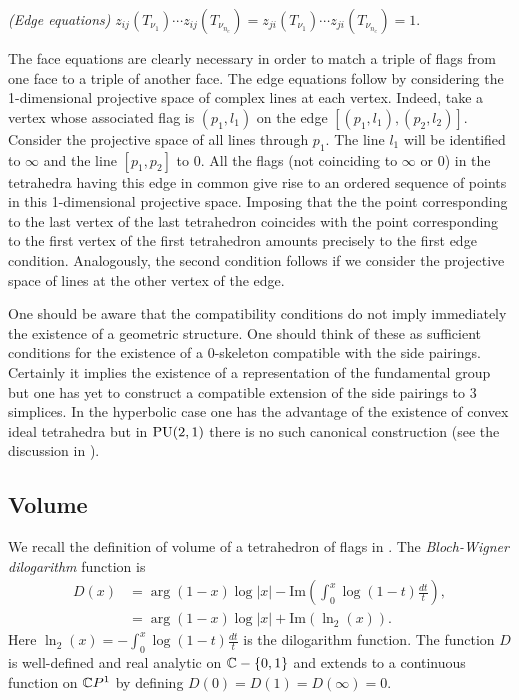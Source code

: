 \medskip

\emph{(Edge equations)} $z_{ij}(T_{\nu_1}) \cdots z_{ij}(T_{\nu_{n_e}})=z_{ji}(T_{\nu_1}) \cdots z_{ji}(T_{\nu_{n_e}})=1$.

\medskip

The face equations are clearly necessary in order to match a triple of flags from one face to a triple of another face.  The edge equations follow by considering the 1-dimensional projective space of complex lines at each vertex.  Indeed, take a vertex whose associated flag is $(p_1,l_1)$ on the edge $[(p_1,l_1),(p_2,l_2)]$.  Consider the projective space of all lines through $p_1$.  The line $l_1$ will be identified to $\infty$ and the line $[p_1,p_2]$ to 0.  All the flags (not coinciding to $\infty$ or 0) in the tetrahedra
having this edge in common give rise to an ordered sequence of points in this 1-dimensional projective space.   Imposing that the the point corresponding to the last vertex of the last tetrahedron coincides with the point corresponding to the first vertex of the first tetrahedron amounts
precisely to the first edge condition.  Analogously, the second condition follows if we consider the projective space of lines at the other vertex of the edge.


One should be aware that the compatibility conditions do not imply immediately the existence of a geometric structure.
One should think of these as sufficient conditions for the existence of a 0-skeleton compatible with the side pairings.
Certainly it implies the existence of a representation of the fundamental group but one has yet to construct a compatible extension of
the side pairings to 3 simplices.   In the hyperbolic case one has the advantage of the existence of convex ideal
tetrahedra but in $\textrm{PU}(2,1)$ there is no such canonical construction (see the discussion in \cite{falbeleight}).



\subsection{Volume}
\label{sec-volume}
We recall the definition of volume of a tetrahedron of flags in \cite{BFG}.
The {\it Bloch-Wigner dilogarithm} function is
\begin{align*}
D(x) & = \arg{(1-x)}\log{|x|}-\mathrm{Im} (\int_{0}^{x}\log{(1-t)}\frac{dt}{t}), \\
& = \arg{(1-x)}\log{|x|} + \mathrm{Im}( \ln_2 (x)).
\end{align*}
Here  $ \ln_2 (x)=-\int_{0}^{x}\log{(1-t)}\frac{dt}{t}$ is the dilogarithm function.
The function $D$ is well-defined and real analytic on $\mathbb{C}-\{0,1\}$ and
extends to a continuous function on $\mathbb{C} P^1$ by
defining $D(0) = D(1) = D(\infty) = 0$.

